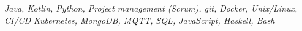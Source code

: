 
\begin{cvskills}
  \cvskill
    {} %
    {\large \textit{ Java, Kotlin, Python, Project management (Scrum), git, Docker, Unix/Linux, CI/CD}}
  \cvskill
    {}
    {\large \textit{ Kubernetes, MongoDB, MQTT, SQL, JavaScript, Haskell, Bash}} %

\end{cvskills}
